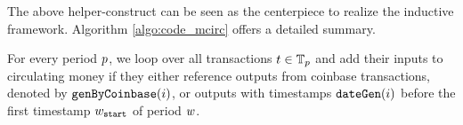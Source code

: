 The above helper-construct can be seen as the centerpiece to realize the inductive framework. %
Algorithm \ref{algo:code_mcirc} offers a detailed summary. %

For every period ${p}$, we loop over all transactions $t\in{{\mathbb{T}}_{p}}$ and add
their inputs to circulating money if they either reference outputs from
coinbase transactions, denoted by ${\mathtt{genByCoinbase}}(i)$, or outputs with
timestamps ${\mathtt{dateGen}}(i)$ before the first timestamp ${w}_{\mathtt{start}}$ of period
${w}$.  %
%
%
%




